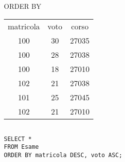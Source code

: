 \begin{frame}{ORDER BY}
\begin{table}[h]
\centering
\begin{minipage}{.45\textwidth}
\centering
\begin{tabular}{|c|c|c|}
\hline
\rowcolor{cyan!30} \multicolumn{3}{|c|}{Esame} \\
\hline
\rowcolor{cyan!30} matricola  & voto & corso \\
\hline
100  & 30 & 27035 \\
100  & 28 & 27038 \\
100  & 18 & 27010 \\
102  & 21 & 27038 \\
101  & 25 & 27045 \\
102 & 21 & 27010 \\
\hline
\end{tabular}
\end{minipage}%
\begin{minipage}{.45\textwidth}
\centering
\begin{tabular}{|c|c|c|}
\hline

\hline
\end{tabular}
\end{minipage}
\end{table}
\vspace{2em}
\texttt{SELECT *\\FROM Esame\\ORDER BY matricola DESC, voto ASC;}
\end{frame}
